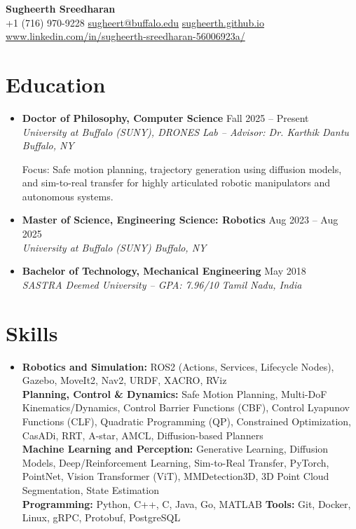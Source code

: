 \documentclass[letterpaper,10.5pt]{article}
\newcommand{\entryheading}[4]{%
  \vspace{2pt}%
  {\bfseries #1} \hfill #2 \\%
  {\itshape #3} \hfill {\itshape #4}%
  \vspace{-4pt}%
}
\newcommand{\sectionliststart}{\begin{itemize}[leftmargin=0in, label={}, itemsep=2pt]}
\newcommand{\sectionlistend}{\end{itemize}}
\begin{document}
\begin{center}
  {\LARGE\bfseries Sugheerth Sreedharan}\\[4pt]
  \small
  +1 (716) 970-9228
  \textbar{}
  \href{mailto:sugheert@buffalo.edu}{sugheert@buffalo.edu}
  \textbar{}
  \href{https://sugheerth.github.io}{sugheerth.github.io}
  \textbar{}
  \href{https://www.linkedin.com/in/sugheerth-sreedharan-56006923a/}{www.linkedin.com/in/sugheerth-sreedharan-56006923a/}
\end{center}
\vspace{-6pt}

\section{Education}
\sectionliststart
  \setlength{\itemsep}{0pt}
  \setlength{\parsep}{0pt}
  \item
    \entryheading
      {Doctor of Philosophy, Computer Science}{Fall 2025 -- Present}
      {University at Buffalo (SUNY), DRONES Lab -- Advisor: Dr. Karthik Dantu}{Buffalo, NY}

    \small{Focus: Safe motion planning, trajectory generation using diffusion models, and sim-to-real transfer for highly articulated robotic manipulators and autonomous systems.}
  \item
    \entryheading
      {Master of Science, Engineering Science: Robotics}{Aug 2023 -- Aug 2025}
      {University at Buffalo (SUNY)}{Buffalo, NY}
  \item
    \entryheading
      {Bachelor of Technology, Mechanical Engineering}{May 2018}
      {SASTRA Deemed University -- GPA: 7.96/10}{Tamil Nadu, India}
\sectionlistend

\section{Skills}
\sectionliststart
  \item\small{
    \textbf{Robotics and Simulation:}
    ROS2 (Actions, Services, Lifecycle Nodes), Gazebo, MoveIt2, Nav2, URDF, XACRO, RViz\\
    \textbf{Planning, Control \& Dynamics:}
    Safe Motion Planning, Multi-DoF Kinematics/Dynamics, Control Barrier Functions (CBF), Control Lyapunov Functions (CLF), Quadratic Programming (QP),
    Constrained Optimization, CasADi, RRT, A-star, AMCL, Diffusion-based Planners\\
    \textbf{Machine Learning and Perception:}
    Generative Learning, Diffusion Models, Deep/Reinforcement Learning, Sim-to-Real Transfer, PyTorch, PointNet, Vision Transformer (ViT), MMDetection3D, 3D Point Cloud Segmentation, State Estimation\\
    \textbf{Programming:} Python, C++, C, Java, Go, MATLAB \quad
    \textbf{Tools:} Git, Docker, Linux, gRPC, Protobuf, PostgreSQL
  }
\sectionlistend
\end{document}
